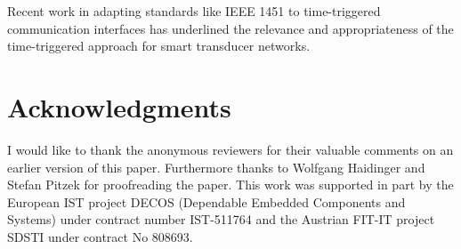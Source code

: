 \documentclass[11pt,a4paper,]{article}
\begin{document}
Recent work in adapting standards like IEEE 1451 to time-triggered
communication interfaces has underlined the relevance and
appropriateness of the time-triggered approach for smart
transducer networks.

\setlength{\baselineskip}{14pt}

\section{Acknowledgments}

I would like to thank the anonymous reviewers for their valuable
comments on an earlier version of this paper. Furthermore thanks to
Wolfgang Haidinger and Stefan Pitzek for proofreading the paper.
This work was supported in part by the European IST project DECOS
(Dependable Embedded Components and Systems) under contract number
IST-511764 and the Austrian FIT-IT project SDSTI under contract No
808693.





\end{document}
